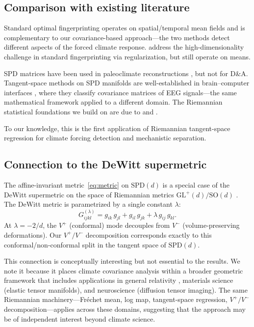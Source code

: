 \documentclass[preprint,12pt]{elsarticle}
\newcommand{\SPD}{\mathrm{SPD}}
\newcommand{\GL}{\mathrm{GL}}
\newcommand{\SO}{\mathrm{SO}}
\begin{document}
\subsection{Comparison with existing literature}\label{sec:literature}

Standard optimal fingerprinting \citep{Hasselmann1979,AllenStott2003,Hegerl2007} operates on spatial/temporal mean fields and is complementary to our covariance-based approach---the two methods detect different aspects of the forced climate response.
\citet{Ribes2013,Ribes2017} address the high-dimensionality challenge in standard fingerprinting via regularization, but still operate on means.

SPD matrices have been used in paleoclimate reconstructions \citep{Smerdon2015,Guillot2015}, but not for D\&A.
Tangent-space methods on SPD manifolds are well-established in brain--computer interfaces \citep{Barachant2013}, where they classify covariance matrices of EEG signals---the same mathematical framework applied to a different domain.
The Riemannian statistical foundations we build on are due to \citet{Pennec2006} and \citet{Said2017}.

To our knowledge, this is the first application of Riemannian tangent-space regression for climate forcing detection and mechanistic separation.

\subsection{Connection to the DeWitt supermetric}\label{sec:dewitt}

The affine-invariant metric~\eqref{eq:metric} on $\SPD(d)$ is a special case of the DeWitt supermetric on the space of Riemannian metrics $\GL^+(d)/\SO(d)$ \citep{DeWitt1967}.
The DeWitt metric is parametrized by a single constant $\lambda$:
\begin{equation}\label{eq:dewitt}
G_{ijkl}^{(\lambda)} = g_{ik}\, g_{jl} + g_{il}\, g_{jk} + \lambda\, g_{ij}\, g_{kl}.
\end{equation}
At $\lambda = -2/d$, the $V^+$ (conformal) mode decouples from $V^-$ (volume-preserving deformations).
Our $V^+/V^-$ decomposition corresponds exactly to this conformal/non-conformal split in the tangent space of $\SPD(d)$.

This connection is conceptually interesting but not essential to the results.
We note it because it places climate covariance analysis within a broader geometric framework that includes applications in general relativity \citep{DeWitt1967}, materials science (elastic tensor manifolds), and neuroscience (diffusion tensor imaging).
The same Riemannian machinery---Fr\'{e}chet mean, log map, tangent-space regression, $V^+/V^-$ decomposition---applies across these domains, suggesting that the approach may be of independent interest beyond climate science.
\end{document}

